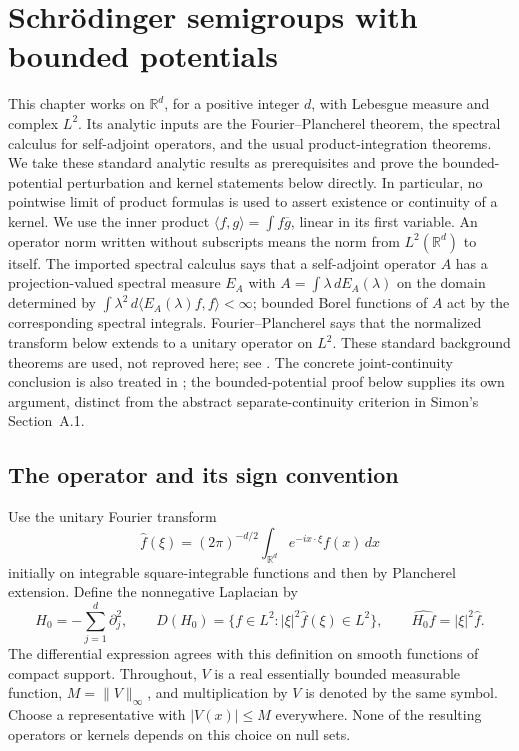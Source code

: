 \def\topic{Schr\"odinger semigroups with bounded potentials}

\section{Schr\"odinger semigroups with bounded potentials}
\label{sec:bounded_schrodinger}
This chapter works on $\mathbb R^d$, for a positive integer $d$, with Lebesgue measure
and complex $L^2$. Its analytic inputs are the Fourier--Plancherel
theorem, the spectral calculus for self-adjoint operators, and the
usual product-integration theorems. We take these standard analytic
results as prerequisites and prove the bounded-potential perturbation
and kernel statements below directly. In particular, no pointwise limit of product formulas
is used to assert existence or continuity of a kernel.
We use the inner product $\langle f,g\rangle=\int f\overline g$,
linear in its first variable. An operator norm written without
subscripts means the norm from $L^2(\mathbb R^d)$ to itself.
The imported spectral calculus says that a self-adjoint operator $A$
has a projection-valued spectral measure $E_A$ with
$A=\int\lambda\,dE_A(\lambda)$ on the domain determined by
$\int\lambda^2\,d\langle E_A(\lambda)f,f\rangle<\infty$;
bounded Borel functions of $A$ act by the corresponding spectral
integrals. Fourier--Plancherel says that the normalized transform below
extends to a unitary operator on $L^2$. These standard background
theorems are used, not reproved here; see \parencite{Weidmann1980Operators}.
The concrete joint-continuity conclusion is also treated in
\parencite[Theorem~B.7.1]{Simon1982Semigroups}; the bounded-potential proof
below supplies its own argument, distinct from the abstract
separate-continuity criterion in Simon's Section~A.1.

\subsection{The operator and its sign convention}
Use the unitary Fourier transform
\[
\widehat f(\xi)=(2\pi)^{-d/2}\int_{\mathbb R^d}
                   e^{-ix\cdot\xi}f(x)\,dx
\]
initially on integrable square-integrable functions and then by
Plancherel extension. Define the nonnegative Laplacian by
\[
H_0=-\sum_{j=1}^d\partial_j^2,\qquad
D(H_0)=\{f\in L^2:|\xi|^2\widehat f(\xi)\in L^2\},\qquad
\widehat{H_0f}=|\xi|^2\widehat f.
\]
The differential expression agrees with this definition on smooth
functions of compact support. Throughout, $V$ is a real essentially
bounded measurable function, $M=\|V\|_\infty$, and multiplication by
$V$ is denoted by the same symbol. Choose a representative with
$|V(x)|\leq M$ everywhere. None of the resulting operators or kernels
depends on this choice on null sets.

